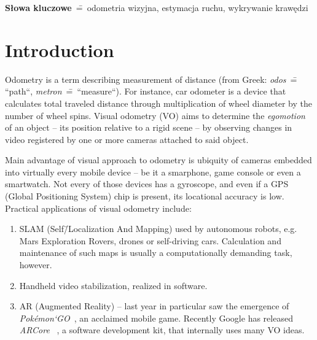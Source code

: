 \textbf{S\l{}owa kluczowe}~\==~odometria wizyjna, estymacja ruchu, wykrywanie kraw\k{e}dzi

\newpage

\section*{Introduction}


Odometry is a term describing measurement of distance (from Greek: \textit{odos}~\==~ ``path``, \textit{metron}~\==~``measure``). For instance, car odometer is a device that calculates total traveled distance through multiplication of wheel diameter by the number of wheel spins. Visual odometry (VO) aims to determine the \textit{egomotion} of an object -- its position relative to a rigid scene -- by observing changes in video registered by one or more cameras attached to said object.

Main advantage of visual approach to odometry is ubiquity of cameras embedded into virtually every mobile device -- be it a smarphone, game console or even a smartwatch. Not every of those devices has a gyroscope, and even if a GPS (Global Positioning System) chip is present, its locational accuracy is low. Practical applications of visual odometry include:
\begin{enumerate}
	\itemsep0em
	\item SLAM (Self\=/Localization And Mapping) used by autonomous robots, e.g. Mars Exploration Rovers, drones or self-driving cars. Calculation and maintenance of such maps is usually a computationally demanding task, however.
	
	\item Handheld video stabilization, realized in software.
	
	\item AR (Augmented Reality) -- last year in particular saw the emergence of \textit{Pok\'emon`GO}~\cite{pineco}, an acclaimed mobile game. Recently Google has released \textit{ARCore}~\cite{androidvr} , a software development kit, that internally uses many VO ideas.
\end{enumerate}


